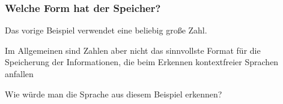\documentclass[aspectratio=1610,onlymath]{beamer}
\begin{document}
\begin{frame}\frametitle{Welche Form hat der Speicher?}

Das vorige Beispiel verwendet eine beliebig große \alert{Zahl}.\pause
\medskip

Im Allgemeinen sind Zahlen aber nicht das sinnvollste Format für die Speicherung der
Informationen, die beim Erkennen kontextfreier Sprachen anfallen
\medskip


Wie würde man die Sprache aus diesem Beispiel erkennen?

\end{frame}
\end{document}
